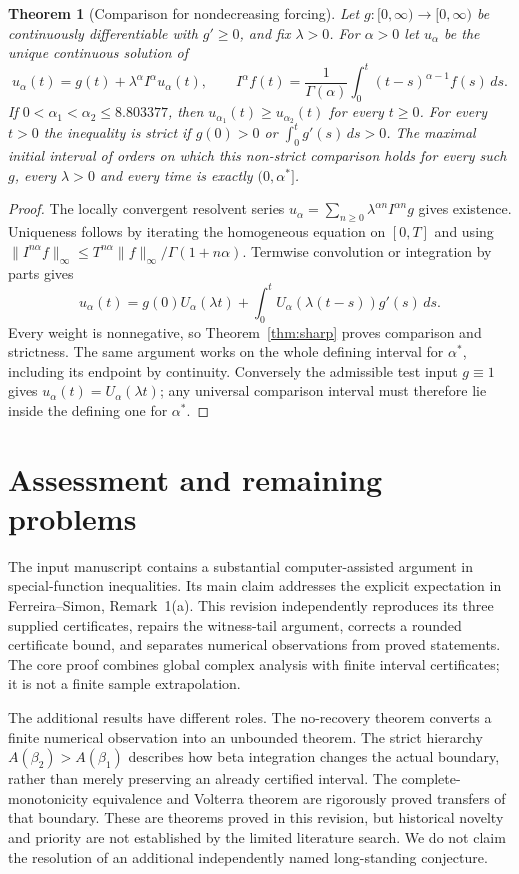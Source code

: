 \documentclass[11pt,a4paper]{article}
\theoremstyle{plain}
\newtheorem{theorem}{Theorem}[section]
\theoremstyle{remark}
\begin{document}
\begin{theorem}[Comparison for nondecreasing forcing]\label{thm:volterra}
Let $g:[0,\infty)\to[0,\infty)$ be continuously differentiable with $g'\ge0$,
and fix $\lambda>0$. For $\alpha>0$ let $u_\alpha$ be the unique continuous
solution of
\[
 u_\alpha(t)=g(t)+\lambda^\alpha I^\alpha u_\alpha(t),\qquad
 I^\alpha f(t)=\frac1{\Gamma(\alpha)}\int_0^t(t-s)^{\alpha-1}f(s)\,ds.
\]
If $0<\alpha_1<\alpha_2\le8.803377$, then
$u_{\alpha_1}(t)\ge u_{\alpha_2}(t)$ for every $t\ge0$.
For every $t>0$ the inequality is strict if $g(0)>0$ or
$\int_0^t g'(s)\,ds>0$.
The maximal initial interval of orders on which this non-strict comparison
holds for every such $g$, every $\lambda>0$ and every time is exactly
$(0,\alpha^*]$.
\end{theorem}
\begin{proof}
The locally convergent resolvent series
$u_\alpha=\sum_{n\ge0}\lambda^{\alpha n}I^{\alpha n}g$ gives existence.
Uniqueness follows by iterating the homogeneous equation on $[0,T]$ and using
$\|I^{n\alpha}f\|_\infty\le T^{n\alpha}\|f\|_\infty/\Gamma(1+n\alpha)$.
Termwise convolution or integration by parts gives
\[
 u_\alpha(t)=g(0)U_\alpha(\lambda t)
          +\int_0^tU_\alpha(\lambda(t-s))g'(s)\,ds.
\]
Every weight is nonnegative, so Theorem~\ref{thm:sharp} proves comparison and
strictness. The same argument works on the whole defining interval for
$\alpha^*$, including its endpoint by continuity. Conversely the admissible
test input $g\equiv1$ gives $u_\alpha(t)=U_\alpha(\lambda t)$; any universal
comparison interval must therefore lie inside the defining one for $\alpha^*$.
\end{proof}

\section{Assessment and remaining problems}\label{sec:assessment}
The input manuscript contains a substantial computer-assisted argument in
special-function inequalities. Its main claim addresses the explicit
expectation in Ferreira--Simon, Remark~1(a). This revision independently
reproduces its three supplied certificates, repairs the witness-tail argument,
corrects a rounded certificate bound, and separates numerical observations
from proved statements. The core proof combines global complex analysis with
finite interval certificates; it is not a finite sample extrapolation.

The additional results have different roles. The no-recovery theorem converts
a finite numerical observation into an unbounded theorem. The strict hierarchy
$A(\beta_2)>A(\beta_1)$ describes how beta integration changes the actual
boundary, rather than merely preserving an already certified interval. The
complete-monotonicity equivalence and Volterra theorem are rigorously proved
transfers of that boundary. These are theorems proved in this revision, but
historical novelty and priority are not established by the limited literature
search. We do not claim the resolution of an additional independently named
long-standing conjecture.
\end{document}
